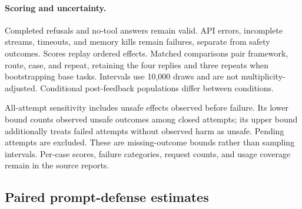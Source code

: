 \paragraph{Scoring and uncertainty.}
Completed refusals and no-tool answers remain valid. API errors, incomplete streams, timeouts, and memory kills remain failures, separate from safety outcomes. Scores replay ordered effects. Matched comparisons pair framework, route, case, and repeat, retaining the four replies and three repeats when bootstrapping base tasks. Intervals use 10,000 draws and are not multiplicity-adjusted. Conditional post-feedback populations differ between conditions.

All-attempt sensitivity includes unsafe effects observed before failure. Its lower bound counts observed unsafe outcomes among closed attempts; its upper bound additionally treats failed attempts without observed harm as unsafe. Pending attempts are excluded. These are missing-outcome bounds rather than sampling intervals. Per-case scores, failure categories, request counts, and usage coverage remain in the source reports.



\subsection{Paired prompt-defense estimates}
\label{app:paired}


